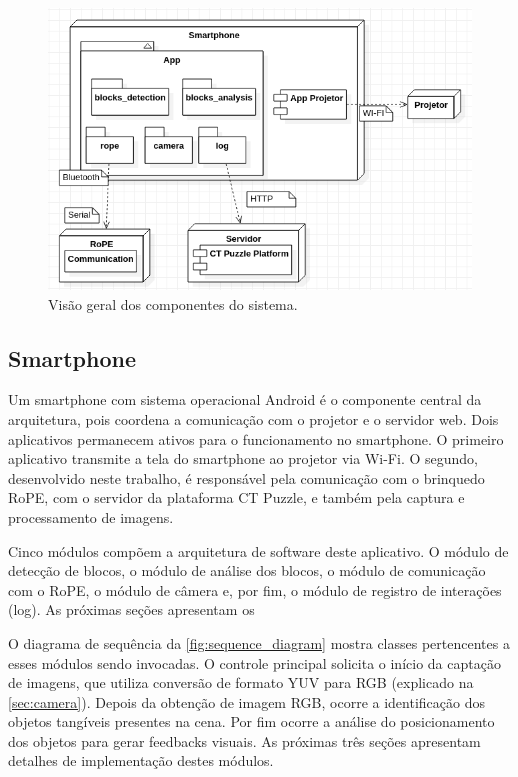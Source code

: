 \begin{figure}
    \centering
    \includegraphics[width=.8\linewidth,fbox]{figs/system_overview.png}
    \caption{Visão geral dos componentes do sistema.}
    \label{fig:system_overview}
\end{figure}

\subsection{Smartphone}
Um smartphone com sistema operacional Android é o componente central da arquitetura, pois coordena a comunicação com o projetor e o servidor web. Dois aplicativos permanecem ativos para o funcionamento no smartphone. O primeiro aplicativo transmite a tela do smartphone ao projetor via Wi-Fi. O segundo, desenvolvido neste trabalho, é responsável pela comunicação com o brinquedo RoPE, com o servidor da plataforma CT Puzzle, e também pela captura e processamento de imagens.

Cinco módulos compõem a arquitetura de software deste aplicativo. O módulo de detecção de blocos, o módulo de análise dos blocos, o módulo de comunicação com o RoPE, o módulo de câmera e, por fim, o módulo de registro de interações (log). As próximas seções apresentam os 

O diagrama de sequência da \autoref{fig:sequence_diagram} mostra classes pertencentes a esses módulos sendo invocadas. O controle principal solicita o início da captação de imagens, que utiliza conversão de formato YUV para RGB (explicado na \autoref{sec:camera}). Depois da obtenção de imagem RGB, ocorre a identificação dos objetos tangíveis presentes na cena. Por fim ocorre a análise do posicionamento dos objetos para gerar feedbacks visuais. As próximas três seções apresentam detalhes de implementação destes módulos.

